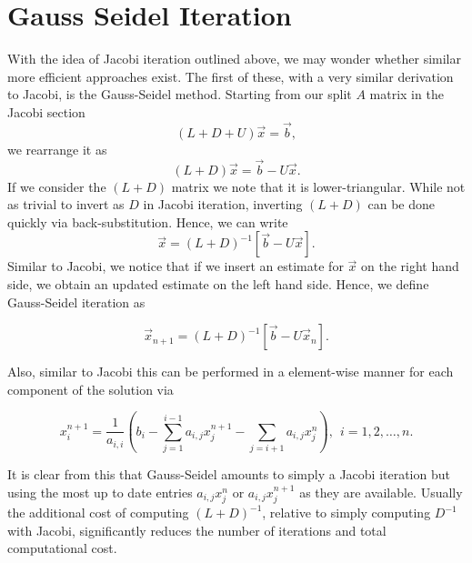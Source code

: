\section{Gauss Seidel Iteration}
With the idea of Jacobi iteration outlined above, we may wonder whether similar more efficient approaches exist. The first of these, with a very similar derivation to Jacobi, is the Gauss-Seidel method. Starting from our split $A$ matrix in the Jacobi section
\begin{equation}
	(L+D+U) \vec{x} = \vec{b},
\end{equation}
we rearrange it as
\begin{equation}
	(L + D)\vec{x} = \vec{b} - U\vec{x}.
\end{equation}
If we consider the $(L+D)$ matrix we note that it is lower-triangular. While not as trivial to invert as $D$ in Jacobi iteration, inverting $(L+D)$ can be done quickly via back-substitution. Hence, we can write
\begin{equation}
	\vec{x} = (L + D)^{-1}\left[ \vec{b} - U\vec{x} \right].
\end{equation}
Similar to Jacobi, we notice that if we insert an estimate for $\vec{x}$ on the right hand side, we obtain an updated estimate on the left hand side. Hence, we define Gauss-Seidel iteration as
\begin{eqBox}
\begin{equation}
	\vec{x}_{n+1} = (L + D)^{-1}\left[ \vec{b} - U\vec{x}_n \right].
\end{equation}
\end{eqBox}
Also, similar to Jacobi this can be performed in a element-wise manner for each component of the solution via
\begin{eqBox}
\begin{equation}
	x_i^{n+1} = \frac{1}{a_{i,i}}\left(b_i - \sum_{j=1}^{i-1} a_{i,j}x_j^{n+1} - \sum_{j=i+1} a_{i,j}x_j^n \right), \: \: i = 1,2,\hdots,n.
\end{equation}
\end{eqBox}
It is clear from this that Gauss-Seidel amounts to simply a Jacobi iteration but using the most up to date entries $a_{i,j}x_j^n$ or $a_{i,j}x_j^{n+1}$ as they are available. Usually the additional cost of computing $(L + D)^{-1}$, relative to simply computing $D^{-1}$ with Jacobi, significantly reduces the number of iterations and total computational cost.

